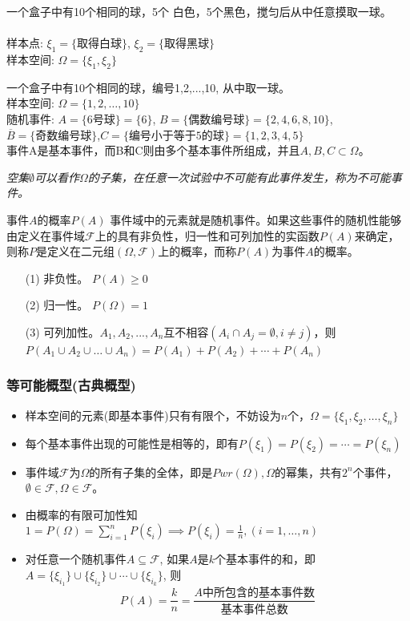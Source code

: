 \begin{frame}
\begin{example}
	一个盒子中有10个相同的球，5个 白色，5个黑色，搅匀后从中任意摸取一球。\\
	~\\
	样本点: $\xi_1=\{\text{取得白球} \}$, $\xi_2=\{\text{取得黑球} \}$\\
	样本空间: $\Omega=\{\xi_1,\xi_2\}$
\end{example}
\begin{example}
	一个盒子中有10个相同的球，编号1,2,...,10, 从中取一球。\\
	样本空间: $\Omega=\{1,2,\dots,10\}$\\
	随机事件: $A=\{\text{6号球} \}=\{6\}$, $B=\{\text{偶数编号球} \}=\{2,4,6,8,10\}$, $\overline{B}=\{\text{奇数编号球}\}$,$C=\{\text{编号小于等于5的球} \}=\{1,2,3,4,5\}$\\
	事件A是基本事件，而B和C则由多个基本事件所组成，并且$A,B,C\subset\Omega$。
\end{example}
\textit{空集$\emptyset$可以看作$\Omega$的子集，在任意一次试验中不可能有此事件发生，称为不可能事件。}
\end{frame}

\begin{frame}{事件$A$的概率$P(A)$}
  事件域中的元素就是随机事件。如果这些事件的随机性能够由定义在事件域$\mathcal{F}$上的具有非负性，归一性和可列加性的实函数$P(A)$来确定，则称$P$是定义在二元组$(\Omega,\mathcal{F})$上的概率，而称$P(A)$为事件$A$的概率。
  \begin{enumerate}
  	\item[(1)] 非负性。 $P(A)\ge 0$
  	\item[(2)] 归一性。 $P(\Omega)=1$
    \item[(3)] 可列加性。$A_1,A_2,...,A_n$互不相容$(A_i\cap A_j=\emptyset,i\ne j)$，则$P(A_1\cup A_2\cup\dots\cup A_n) = P(A_1)+P(A_2)+\cdots+P(A_n)$
  \end{enumerate}
\end{frame}

\begin{frame}
\frametitle{等可能概型(古典概型)}
\begin{itemize}
	\item 样本空间的元素(即基本事件)只有有限个，不妨设为$n$个，$\Omega=\{\xi_1,\xi_2,\dots,\xi_n\}$
	\item 每个基本事件出现的可能性是相等的，即有$P(\xi_1)=P(\xi_2)=\cdots=P(\xi_n)$
	\item 事件域$\mathcal{F}$为$\Omega$的所有子集的全体，即是$Pwr(\Omega),\Omega$的幂集，共有$2^n$个事件，$\emptyset\in\mathcal{F},\Omega\in\mathcal{F}$。
	\item 由概率的有限可加性知\\
	$1=P(\Omega)=\sum\limits_{i=1}^{n}P(\xi_i)\implies P(\xi_i)=\frac{1}{n},(i=1,\dots,n)$
	\item 对任意一个随机事件$A\subseteq\mathcal{F}$, 如果$A$是$k$个基本事件的和，即$A=\{\xi_{i_1}\}\cup \{\xi_{i_2}\}\cup\cdots\cup\{\xi_{i_k}\}$, 则
	$$P(A)=\frac{k}{n}=\frac{\text{$A$中所包含的基本事件数}}{\text{基本事件总数}}$$
\end{itemize}
\end{frame}

